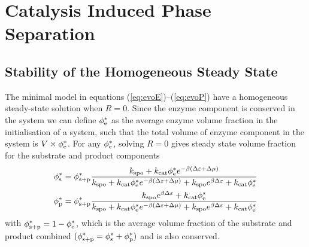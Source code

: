 \section{Catalysis Induced Phase Separation}
\subsection{Stability of the Homogeneous Steady State}
The minimal model in equations (\ref{eq:evoE})--(\ref{eq:evoP}) have a homogeneous steady-state solution when $R=0$. Since the enzyme component is conserved in the system we can define $\phi_{\mathrm{e}}^*$ as the average enzyme volume fraction in the initialisation of a system, such that the total volume of enzyme component in the system is $V \times \phi_{\mathrm{e}}^*$. For any $\phi_{\mathrm{e}}^*$, solving $R=0$ gives steady state volume fraction for the substrate and product components
\begin{align}
    \phi_{\mathrm{s}}^* &= \phi_{\mathrm{s+p}}^*\frac{k_{\mathrm{spo}} + k_{\mathrm{cat}}\phi_{\mathrm{e}}^*e^{-\beta(\Delta \varepsilon + \Delta\mu)}}{k_{\mathrm{spo}} + k_{\mathrm{cat}}\phi_{\mathrm{e}}^*e^{-\beta (\Delta \varepsilon + \Delta\mu)}+k_{\mathrm{spo}} e^{\beta \Delta \varepsilon} + k_{\mathrm{cat}}\phi_{\mathrm{e}}^*}
    \label{eq:sstar}
    \\
    \phi_{\mathrm{p}}^* &= \phi_{\mathrm{s+p}}^*\frac{k_{\mathrm{spo}} e^{\beta \Delta \varepsilon} + k_{\mathrm{cat}}\phi_{\mathrm{e}}^*}{k_{\mathrm{spo}} + k_{\mathrm{cat}}\phi_{\mathrm{e}}^*e^{-\beta (\Delta \varepsilon + \Delta\mu)}+k_{\mathrm{spo}} e^{\beta \Delta \varepsilon} + k_{\mathrm{cat}}\phi_{\mathrm{e}}^*}
    \label{eq:pstar}
\end{align}
with $\phi_{\mathrm{s+p}}^*=1-\phi_{\mathrm{e}}^*$, which is the average volume fraction of the substrate and product combined $(\phi_{\mathrm{s+p}}^*=\phi_{\mathrm{s}}^*+\phi_{\mathrm{p}}^*)$ and is also conserved.

